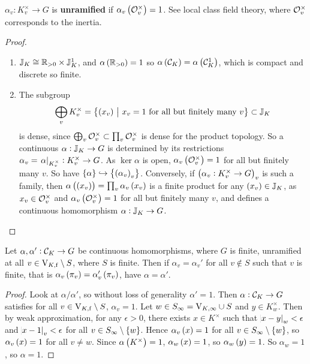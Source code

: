 \begin{notation*}
$ \alpha_v : K_v^\times \to G $ is \textbf{unramified} if $ \alpha_v\br{\OOO_v^\times} = 1 $. See local class field theory, where $ \mathcal{O}_v^\times $ corresponds to the inertia.
\end{notation*}

\begin{proof}
\hfill
\begin{enumerate}
\item $ \mathbb{J}_K \cong \mathbb{R}_{> 0} \times \mathbb{J}_K^1 $, and $ \alpha\br{\RR_{> 0}} = 1 $ so $ \alpha\br{\CCC_K} = \alpha\br{\CCC_K^1} $, which is compact and discrete so finite.
\item The subgroup
$$ \bigoplus_v K_v^\times = \cbr{\br{x_v} \st x_v = 1 \ \text{for all but finitely many} \ v} \subset \JJ_K $$
is dense, since $ \bigoplus_v \mathcal{O}_v^\times \subset \prod_v \mathcal{O}_v^\times $ is dense for the product topology. So a continuous $ \alpha : \mathbb{J}_K \to G $ is determined by its restrictions $ \alpha_v = \left. \alpha \right|_{K_v^\times} : K_v^\times \to G $. As $ \ker \alpha $ is open, $ \alpha_v\br{\OOO_v^\times} = 1 $ for all but finitely many $ v $. So have $ \cbr{\alpha} \hookrightarrow \cbr{\br{\alpha_v}_v} $. Conversely, if $ \br{\alpha_v : K_v^\times \to G}_v $ is such a family, then $ \alpha\br{\br{x_v}} = \prod_v \alpha_v\br{x_v} $ is a finite product for any $ \br{x_v} \in \JJ_K $, as $ x_v \in \mathcal{O}_v^\times $ and $ \alpha_v\br{\OOO_v^\times} = 1 $ for all but finitely many $ v $, and defines a continuous homomorphism $ \alpha : \mathbb{J}_K \to G $.
\end{enumerate}
\end{proof}


\begin{proposition}
\label{prop:8.2}
Let $ \alpha, \alpha' : \mathcal{C}_K \to G $ be continuous homomorphisms, where $ G $ is finite, unramified at all $ v \in \mathrm{V}_{K, \mathrm{f}} \setminus S $, where $ S $ is finite. Then if $ \alpha_v = \alpha_v' $ for all $ v \notin S $ such that $ v $ is finite, that is $ \alpha_v\br{\pi_v} = \alpha_v'\br{\pi_v} $, have $ \alpha = \alpha' $.
\end{proposition}

\begin{proof}
Look at $ \alpha / \alpha' $, so without loss of generality $ \alpha' = 1 $. Then $ \alpha : \mathcal{C}_K \to G $ satisfies for all $ v \in \mathrm{V}_{K, \mathrm{f}} \setminus S $, $ \alpha_v = 1 $. Let $ w \in S_\infty = \mathrm{V}_{K, \infty} \cup S $ and $ y \in K_w^\times $. Then by weak approximation, for any $ \epsilon > 0 $, there exists $ x \in K^\times $ such that $ \abs{x - y}_w < \epsilon $ and $ \abs{x - 1}_v < \epsilon $ for all $ v \in S_\infty \setminus \cbr{w} $. Hence $ \alpha_v\br{x} = 1 $ for all $ v \in S_\infty \setminus \cbr{w} $, so $ \alpha_v\br{x} = 1 $ for all $ v \ne w $. Since $ \alpha\br{K^\times} = 1 $, $ \alpha_w\br{x} = 1 $, so $ \alpha_w\br{y} = 1 $. So $ \alpha_w = 1 $, so $ \alpha = 1 $.
\end{proof}

